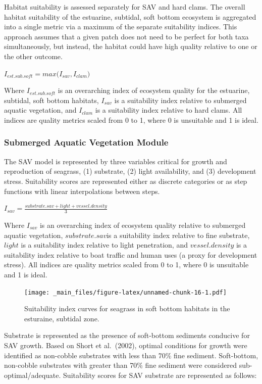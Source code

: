 \documentclass[
]{book}
\begin{document}
Habitat suitability is assessed separately for SAV and hard clams. The overall habitat suitability of the estuarine, subtidal, soft bottom ecosystem is aggregated into a single metric via a maximum of the separate suitability indices. This approach assumes that a given patch does not need to be perfect for both taxa simultaneously, but instead, the habitat could have high quality relative to one or the other outcome.

\(I_{est.sub.soft} = max({I_{sav},I_{clam})}\)

Where \(I_{est.sub.soft}\) is an overarching index of ecosystem quality for the estuarine, subtidal, soft bottom habitats, \(I_{sav}\) is a suitability index relative to submerged aquatic vegetation, and \(I_{clam}\) is a suitability index relative to hard clams. All indices are quality metrics scaled from 0 to 1, where 0 is unsuitable and 1 is ideal.

\hypertarget{submerged-aquatic-vegetation-module}{%
\subsubsection{Submerged Aquatic Vegetation Module}\label{submerged-aquatic-vegetation-module}}

The SAV model is represented by three variables critical for growth and reproduction of seagrass, (1) substrate, (2) light availability, and (3) development stress. Suitability scores are represented either as discrete categories or as step functions with linear interpolations between steps.

\(I_{sav} = \frac{substrate.sav + light + vessel.density}{3}\)

Where \(I_{sav}\) is an overarching index of ecosystem quality relative to submerged aquatic vegetation, \(substrate.sav\)is a suitability index relative to fine substrate, \(light\) is a suitability index relative to light penetration, and \(vessel.density\) is a suitability index relative to boat traffic and human uses (a proxy for development stress). All indices are quality metrics scaled from 0 to 1, where 0 is unsuitable and 1 is ideal.

\begin{figure}
\centering
\texttt{[image: \_main\_files/figure-latex/unnamed-chunk-16-1.pdf]}
\caption{\label{fig:unnamed-chunk-16}Suitability index curves for seagrass in soft bottom habitats in the esturaine, subtidal zone.}
\end{figure}

Substrate is represented as the presence of soft-bottom sediments conducive for SAV growth. Based on Short et al.~(2002), optimal conditions for growth were identified as non-cobble substrates with less than 70\% fine sediment. Soft-bottom, non-cobble substrates with greater than 70\% fine sediment were considered sub-optimal/adequate. Suitability scores for SAV substrate are represented as follows:
\end{document}

